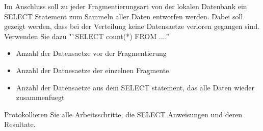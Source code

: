 Im Anschluss soll zu jeder Fragmentierungsart von der lokalen Datenbank ein SELECT Statement zum Sammeln aller Daten entworfen werden. Dabei soll gezeigt werden, dass bei der Verteilung keine Datensaetze verloren gegangen sind. Verwenden Sie dazu "`SELECT count(*) FROM ....''

\begin{itemize}
	\item Anzahl der Datensaetze vor der Fragmentierung
	\item Anzahl der Datnesaetze der einzelnen Fragmente
	\item Anzahl der Datensaetze aus dem SELECT statement, das alle Daten wieder zusammenfuegt
\end{itemize}
Protokollieren Sie alle Arbeitsschritte, die SELECT Anweisungen und deren Resultate.

\clearpage

